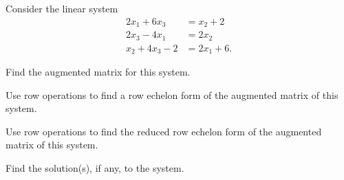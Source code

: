 
\ExampleIntro

\begin{example} Consider the linear system
\begin{align*}
2x_1 + 6x_3 &= x_2 + 2  \\
2x_3 - 4x_1  &=  2x_2\\
x_2 + 4x_3 - 2 &= 2x_1 + 6.
\end{align*}
	\ba
	\item Find the augmented matrix for this system.
	\item Use row operations to find a row echelon form of the augmented matrix of this system.
	\item Use row operations to find the reduced row echelon form of the augmented matrix of this system. 
	\item Find the solution(s), if any, to the system.
	\ea
	

\end{example}
